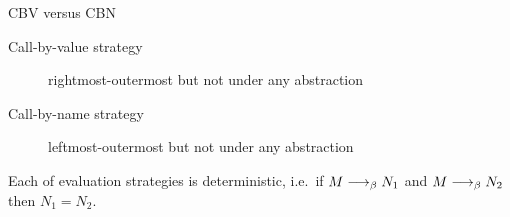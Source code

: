 \begin{frame}{CBV versus CBN}
\begin{description}
  \item[Call-by-value strategy]
    rightmost-outermost but not under any abstraction
  \item[Call-by-name strategy]
    leftmost-outermost but not under any abstraction
\end{description}

\begin{proposition}[Determinacy]
  Each of evaluation strategies is deterministic, i.e.\ 
  if $M \longrightarrow_{\beta} N_1$ and $M \longrightarrow_{\beta} N_2$ then $N_1 = N_2$.
\end{proposition}
\end{frame}


